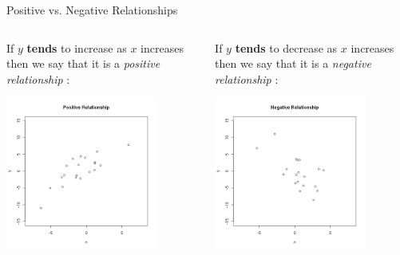 \begin{frame}{Positive vs. Negative Relationships}

  \begin{columns}

    \begin{definition}
      If $y$ \textbf{tends} to increase as $x$ increases then we say
      that it is a \textit{positive relationship} : \\
      \centerline{\includegraphics[width=5cm]{img/positiveRelationship}}
    \end{definition}


    \begin{definition}
      If $y$ \textbf{tends} to decrease as $x$ increases then we say
      that it is a \textit{negative relationship} : \\
      \centerline{\includegraphics[width=5cm]{img/negativeRelationship}}
    \end{definition}

  \end{columns}
  
\end{frame}



